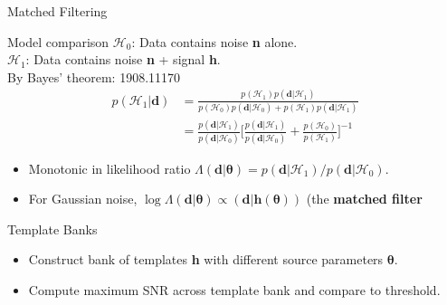 \documentclass[aspectratio=169, 11pt]{beamer}
\def \bblock{\begin{beamerboxesrounded}[upper=uppercolor,lower=lowercolor,shadow=true]}
\def \eblock{\end{beamerboxesrounded}}
\begin{document}
\begin{frame}{Matched Filtering}
\begin{minipage}{0.55\textwidth}\vspace{1em}
\bblock{Model comparison}
$\mathcal{H}_0$: Data contains noise \textbf{n} alone. \\
$\mathcal{H}_1$: Data contains noise \textbf{n} + signal \textbf{h}. \\

By Bayes' theorem: {\tiny 1908.11170} \\ 
     \begin{align}
         p(\mathcal{H}_1 | \textbf{d}) &= \frac{p(\mathcal{H}_1) p(\textbf{d} | \mathcal{H}_1)}{p(\mathcal{H}_0) p(\textbf{d} | \mathcal{H}_0) + p(\mathcal{H}_1) p(\textbf{d} |\mathcal{H}_1)} \\
&= \frac{p(\textbf{d} | \mathcal{H}_1)}{p(\textbf{d} | \mathcal{H}_0)} \biggl[ \frac{p(\textbf{d} | \mathcal{H}_1)}{p(\textbf{d} | \mathcal{H}_0)} +
\frac{p(\mathcal{H}_0)}{p(\mathcal{H}_1)} \biggr]^{-1}
\end{align}
\eblock
\end{minipage}
\hspace{1em}
\begin{minipage}{0.4\textwidth} \vspace{0.2cm}
\begin{block}{}
\begin{itemize}
    \item Monotonic in likelihood ratio $\Lambda(\textbf{d}|\boldsymbol{\theta}) = p(\textbf{d} | \mathcal{H}_1) / p(\textbf{d} | \mathcal{H}_0)$.
    \item  For Gaussian noise, $\log\Lambda(\textbf{d}|\boldsymbol{\theta}) \propto (\textbf{d} | \textbf{h}(\boldsymbol{\theta}))$ (the \textbf{matched filter}
\end{itemize}
\end{block}
\begin{block}{Template Banks}
    \begin{itemize}
        \item Construct bank of templates \textbf{h} with different source parameters $\boldsymbol{\theta}$.
        \item Compute maximum SNR across template bank and compare to threshold.
    \end{itemize}
\end{block}
\end{minipage}
\end{frame}
\end{document}
